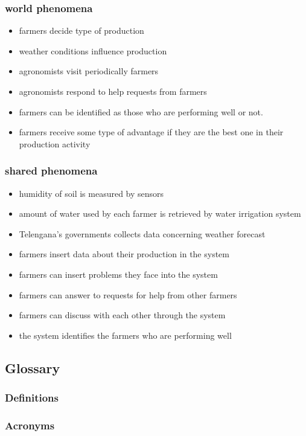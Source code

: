 \subsubsection{world phenomena}
\begin{itemize}
    \item farmers decide type of production
    \item weather conditions influence production
    \item agronomists visit periodically farmers
    \item agronomists respond to help requests from farmers
    \item farmers can be identified as those who are performing well or not.
    \item farmers receive some type of advantage if they are the best one in their production activity
\end{itemize}

\subsubsection{shared phenomena}

\begin{itemize}
    \item humidity of soil is measured by sensors 
    \item amount of water used by each farmer is retrieved by water irrigation system
    \item Telengana's governments collects data concerning weather forecast
    \item farmers insert data about their production in the system
    \item farmers can insert problems they face into the system
    \item farmers can answer to requests for help from other farmers
    \item farmers can discuss with each other through the system
    \item the system identifies the farmers who are performing well
\end{itemize}

\subsection{Glossary}
\subsubsection{Definitions}
\subsubsection{Acronyms}
